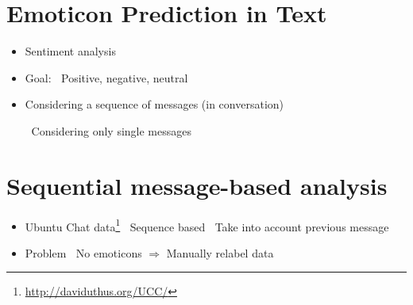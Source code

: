 \documentclass[
paper=128mm:96mm, %
fontsize=11pt, %
pagesize, %
parskip=half-, %
]{scrartcl} %
\newcommand{\red}[1]{\textit{\color{red}{#1}}}
\theoremstyle{mythmstyle} %
\begin{document}
\section{Emoticon Prediction in Text}


\begin{itemize}
\item Sentiment analysis
\item Goal: 
\subitem \textbullet $\:$ Positive, negative, neutral

\item Considering a sequence of messages (in conversation)

\subitem \textbullet $\:$ Considering only single messages

\end{itemize}



\clearpage




\section{Sequential message-based analysis}

\begin{itemize}
\item Ubuntu Chat data\footnote{\url{http://daviduthus.org/UCC/}}
\subitem \textbullet $\:$ Sequence based
\subitem \textbullet $\:$ Take into account previous message

\item Problem
\subitem \textbullet $\:$ No emoticons $\Rightarrow$ Manually relabel data
\end{itemize}


\clearpage
\end{document}
